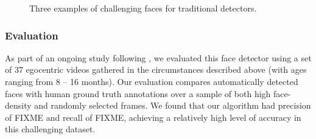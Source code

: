 \documentclass[10pt,letterpaper]{article}
\begin{document}
\begin{figure}[t]
    \caption{Three examples of challenging faces for traditional detectors.}
\label{fig:faces}
\end{figure}

\subsubsection{Evaluation}

As part of an ongoing study following , we evaluated this face detector using a set of 37 egocentric videos gathered in the circumstances described above (with ages ranging from 8 -- 16 months).  Our evaluation compares automatically detected faces with human ground truth annotations over a sample of both high face-density and randomly selected frames. We found that our algorithm had precision of FIXME and recall of FIXME, achieving a relatively high level of accuracy in this challenging dataset. 




\end{document}
